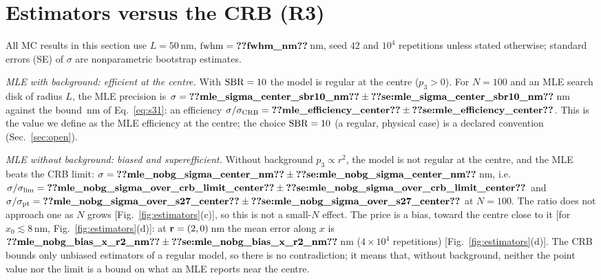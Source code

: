 \section{Estimators versus the CRB (R3)}\label{sec:estimators}

All MC results in this section use $L=50$\,nm, $\fwhm=\pnum{fwhm_nm}\src{fwhm_nm}$\,nm, seed
$42$ and $10^4$ repetitions unless stated otherwise; standard errors (SE) of $\sigma$ are
nonparametric bootstrap estimates.

\emph{MLE with background: efficient at the centre.} With $\mathrm{SBR}=10$ the model is regular at the
centre ($p_3>0$). For $N=100$ and an MLE search disk of radius $L$, the MLE precision is
$\sigma=\pnum{mle_sigma_center_sbr10_nm}\pm\pnumse{mle_sigma_center_sbr10_nm}$\,nm
against the bound \,nm of
Eq.~\eqref{eq:s31}: an efficiency
$\sigma/\crb=\pnum{mle_efficiency_center}\pm\pnumse{mle_efficiency_center}$.
This is the value we define as the MLE efficiency at the centre; the choice $\mathrm{SBR}=10$ (a
regular, physical case) is a declared convention (Sec.~\ref{sec:open}).

\emph{MLE without background: biased and superefficient.} Without background $p_3\propto r^2$,
the model is not regular at the centre, and the MLE beats the CRB limit:
$\sigma=\pnum{mle_nobg_sigma_center_nm}\pm\pnumse{mle_nobg_sigma_center_nm}$\,nm,
i.e.\ $\sigma/\sigma_{\lim}=\pnum{mle_nobg_sigma_over_crb_limit_center}\pm\pnumse{mle_nobg_sigma_over_crb_limit_center}$
and $\sigma/\sigma_{\mathrm{pt}}=\pnum{mle_nobg_sigma_over_s27_center}\pm\pnumse{mle_nobg_sigma_over_s27_center}$
at $N=100$. The ratio does not approach one as $N$ grows [Fig.~\ref{fig:estimators}(c)], so this
is not a small-$N$ effect. The price is a bias, toward the centre close to it
[for $x_0\lesssim8$\,nm, Fig.~\ref{fig:estimators}(d)]: at $\mathbf{r}=(2,0)$\,nm the mean
error along $x$ is
$\pnum{mle_nobg_bias_x_r2_nm}\pm\pnumse{mle_nobg_bias_x_r2_nm}$\,nm
($4\times10^4$ repetitions) [Fig.~\ref{fig:estimators}(d)]. The CRB bounds only unbiased
estimators of a regular model, so there is no contradiction; it means that, without background,
neither the point value nor the limit is a bound on what an MLE reports near the centre.

